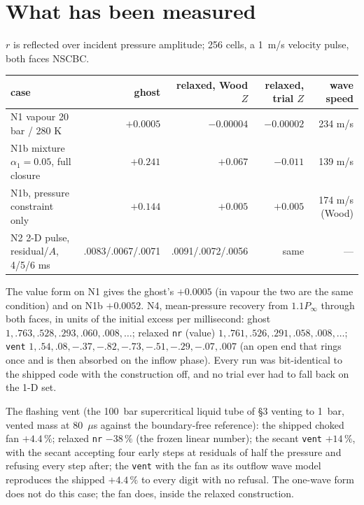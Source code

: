 \documentclass[11pt,a4paper]{article}
\newcommand{\code}[1]{\texttt{\small #1}}
\newcommand{\Pinf}{P_\infty}
\begin{document}
\section{What has been measured}
\label{sec:meas}

$r$ is reflected over incident pressure amplitude; 256 cells, a 1~m/s
velocity pulse, both faces NSCBC.

\begin{center}
\footnotesize
\setlength{\tabcolsep}{4pt}
\begin{tabular}{lrrrr}
\toprule
case & ghost & relaxed, Wood $Z$ & relaxed, trial $Z$ & wave speed \\
\midrule
N1 vapour 20 bar / 280 K & $+0.0005$ & $-0.00004$ & $-0.00002$ & 234 m/s \\
N1b mixture $\alpha_1 = 0.05$, full closure & $+0.241$ & $+0.067$ & $\mathbf{-0.011}$ & 139 m/s \\
N1b, pressure constraint only & $+0.144$ & $+0.005$ & $+0.005$ & 174 m/s (Wood) \\
N2 2-D pulse, residual/$A$, 4/5/6 ms & .0083/.0067/.0071 & .0091/.0072/.0056 & same & --- \\
\bottomrule
\end{tabular}
\normalsize
\end{center}

The value form on N1 gives the ghost's $+0.0005$ (in vapour the two are
the same condition) and on N1b $+0.0052$.  N4, mean-pressure recovery
from $1.1\Pinf$ through both faces, in units of the initial excess per
millisecond: ghost $1, .763, .528, .293, .060, .008, \ldots$; relaxed
\code{nr} (value) $1, .761, .526, .291, .058, .008, \ldots$; \code{vent}
$1, .54, .08, -.37, -.82, -.73, -.51, -.29, -.07, .007$ (an open end that
rings once and is then absorbed on the inflow phase).  Every run was
bit-identical to the shipped code with the construction off, and no
trial ever had to fall back on the 1-D set.

The flashing vent (the 100~bar supercritical liquid tube of \S3
venting to 1~bar, vented mass at 80~$\mu$s against the boundary-free
reference): the shipped choked fan $+4.4\,\%$; relaxed \code{nr}
$-38\,\%$ (the frozen linear number); the secant \code{vent} $+14\,\%$,
with the secant accepting four early steps at residuals of half the
pressure and refusing every step after; the \code{vent} with the fan as
its outflow wave model reproduces the shipped $+4.4\,\%$ to every digit
with no refusal.  The one-wave form does not do this case; the fan does,
inside the relaxed construction.
\end{document}

